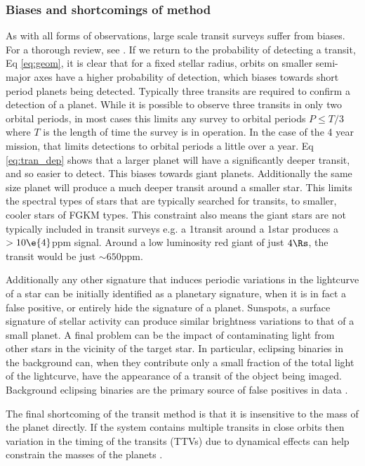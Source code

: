 \subsubsection{Biases and shortcomings of method}
As with all forms of observations, large scale transit surveys suffer from biases. For a thorough review, see \cite{2013Gaidos}. If we return to the probability of detecting a transit, Eq \ref{eq:geom}, it is clear that for a fixed stellar radius, orbits on smaller semi-major axes have a higher probability of detection, which biases towards short period planets being detected.  Typically three transits are required to confirm a detection of a planet. While it is possible to observe three transits in only two orbital periods, in most cases this limits any survey to orbital periods $P\leq T/3$ where $T$ is the length of time the survey is in operation. In the case of the 4 year \Kepler mission, that limits detections to orbital periods a little over a year. Eq \ref{eq:tran_dep} shows that a larger planet will have a significantly deeper transit, and so easier to detect. This biases towards giant planets. Additionally the same size planet will produce a much deeper transit around a smaller star. This limits the spectral types of stars that are typically searched for transits, to smaller, cooler stars of FGKM types. This constraint also means the giant stars are not typically included in transit surveys e.g. a 1\Rj transit around a 1\Rs star produces a $>10\e{4}$ppm signal. Around a low luminosity red giant of just $4\Rs$, the transit would be just ${\sim650}$ppm.

Additionally any other signature that induces periodic variations in the lightcurve of a star can be initially identified as a planetary signature, when it is in fact a false positive, or entirely hide the signature of a planet. Sunspots, a surface signature of stellar activity can produce similar brightness variations to that of a small planet. A final problem can be the impact of contaminating light from other stars in the vicinity of the target star. In particular, eclipsing binaries in the background can, when they contribute only a small fraction of the total light of the lightcurve, have the appearance of a transit of the object being imaged. Background eclipsing binaries are the primary source of false positives in \Kepler data \citep{2010Batalha_fp}.

The final shortcoming of the transit method is that it is insensitive to the mass of the planet directly. If the system contains multiple transits in close orbits then variation in the timing of the transits (TTVs) due to dynamical effects can help constrain the masses of the planets \citep{2011Ballard}. 


